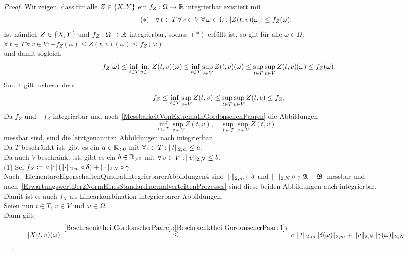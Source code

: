 \begin{proof}
Wir zeigen, dass für alle $Z \in \left\{X, Y\right\}$ ein
 $f_Z: \Omega \rightarrow \mathbb{R}$ integrierbar existiert mit
\[(\ast)\quad
\forall\, t \in T \, \forall\, v \in V \, \forall\, \omega \in \Omega:
 \left|Z(t, v)(\omega)\right| \le f_Z(\omega)\text.\]
Ist nämlich $Z \in \left\{X, Y\right\}$ und $f_Z :\Omega \rightarrow \mathbb{R}$ integrierbar, 
sodass $(\ast)$ erfüllt ist, so gilt für alle $\omega \in \Omega$:
$\forall\,t \in T \, \forall\, v \in V:
-f_Z(\omega) \le Z(t, v) (\omega) \le f_Z(\omega)$\\
und damit sogleich
\[-f_Z(\omega) \le \inf_{t \in T}\inf_{v \in V} Z(t, v)(\omega)
\le \inf_{t \in T}\sup_{v \in V} Z (t, v) (\omega)
\le \sup_{t \in T}\sup_{v\in V} Z(t, v)(\omega) \le f_Z(\omega)\text.\]
Somit gilt insbesondere
\[-f_Z \le \inf_{t \in T}\sup_{v \in V} Z (t, v)
\le \sup_{t \in T}\sup_{v\in V} Z(t, v) \le f_Z\text.\]
Da $f_Z$ und $-f_Z$ integrierbar und nach~\ref{MessbarkeitVonExtremaInGordonschenPaaren} die Abbildungen
\[\inf_{t\in T}\sup_{v\in V}Z(t, v),\quad \sup_{t \in T}\sup_{v\in V} Z(t, v)\]
messbar sind, sind die letztgenannten Abbildungen nach
integrierbar.\\
Da $T$ beschränkt ist, gibt es ein $a \in \mathbb{R}_{>0}$ mit 
$\forall\, t \in T: \lVert t\rVert_{2, m} \le a$.\\
Da auch $V$ beschränkt ist, gibt
es ein $b \in \mathbb{R}_{>0}$ mit $\forall\, v \in V: \lVert v\rVert_{2, N} \le b$.\\
(1) Sei 
$f_X\coloneqq a\left|c\right|(\lVert\cdot\rVert_{2,m}\circ\delta) + \lVert\cdot\rVert_{2, N} \circ\gamma$.\\
Nach~
{ElementareEigenschaftenQuadratintegrierbarerAbbildungen4} sind
$\lVert\cdot\rVert_{2,m} \circ \delta$ und $\lVert\cdot\rVert_{2, N} \circ\gamma$ 
$\mathfrak{A}-\mathfrak{B}$--messbar und nach~\ref{ErwartungswertDer2NormEinesStandardnormalverteiltenProzesses} sind diese
beiden Abbildungen auch integrierbar.\\
Damit ist es auch $f_X$ als Linearkombination integrierbarer Abbildungen.\\
Seien nun $t \in T$, $v \in V$ und $\omega \in \Omega$.\\
Dann gilt:
\begin{align*}
\abs{X(t, v)(\omega)}&\overset{\refclaim{BeschraenktheitGordonscherPaare}
{BeschraenktheitGordonscherPaare1}}\le
\abs c \norm t _{2, m}\norm {\delta(\omega)}_{2, m} 
+ \norm v _{2, N}\norm{\gamma(\omega)}_{2, N}\\

\end{align*}
\end{proof}
